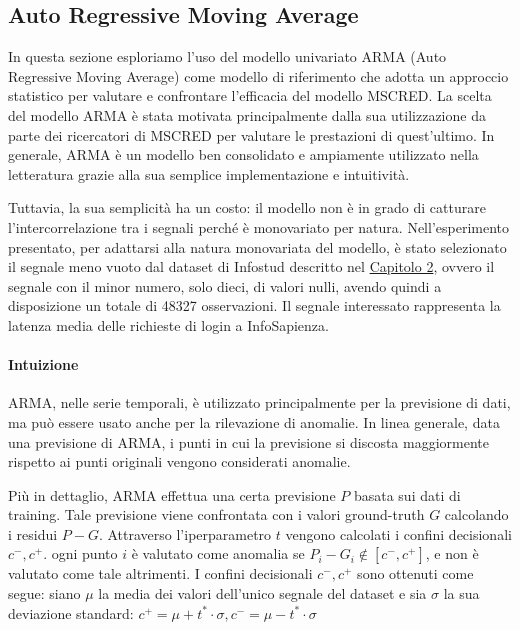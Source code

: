 
\subsection{Auto Regressive Moving Average}
    In questa sezione esploriamo l'uso del modello univariato ARMA\cite{arma} 
    (Auto Regressive Moving Average) come 
    modello di riferimento che adotta un approccio statistico per valutare e confrontare l'efficacia del modello MSCRED\cite{mscred}.
    La scelta del modello ARMA è stata motivata principalmente dalla sua 
    utilizzazione da parte dei ricercatori di MSCRED per valutare le prestazioni di quest'ultimo. In generale, 
    ARMA è un modello ben consolidato e ampiamente utilizzato nella letteratura grazie alla sua semplice 
    implementazione e intuitività.

    Tuttavia, la sua semplicità ha un costo: il modello non è in grado di catturare l'intercorrelazione 
    tra i segnali perché è monovariato per natura. 
    Nell'esperimento presentato, per adattarsi alla natura monovariata del modello, è stato selezionato il
    segnale meno vuoto dal dataset di Infostud descritto nel \hyperref[cap2]{Capitolo 2}, ovvero il segnale con
    il minor numero, solo dieci, di valori nulli, avendo quindi a disposizione un totale di 48327 osservazioni.
    Il segnale interessato rappresenta la latenza media delle richieste di login a InfoSapienza.


    \paragraph{Intuizione} ARMA, nelle serie temporali, è utilizzato principalmente per la previsione di dati, ma 
    può essere usato anche per la rilevazione di anomalie. In linea generale, data una previsione di ARMA, i punti 
    in cui la previsione si discosta maggiormente rispetto ai punti originali vengono considerati anomalie.

    Più in dettaglio, ARMA effettua una certa previsione $P$ basata sui dati di training. Tale previsione viene 
    confrontata con i valori ground-truth $G$ calcolando i residui $P-G$. Attraverso l'iperparametro $t$ 
    vengono calcolati i confini decisionali $c^-, c^+$. ogni punto $i$ è valutato come anomalia se $P_i-G_i \notin [c^-, c^+]$,
    e non è valutato come tale altrimenti. 
    I confini decisionali $c^-, c^+$ sono ottenuti come segue: siano $\mu$ la media dei valori dell'unico segnale
    del dataset e sia $\sigma$ la sua deviazione standard: $c^+ = \mu + t^*\cdot\sigma, c^- = \mu - t^*\cdot\sigma$



